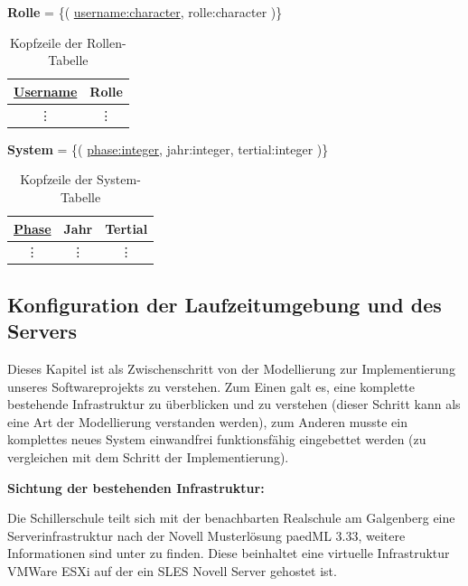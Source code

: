 \textbf{Rolle} = \{( \underline{username:character}, rolle:character )\}

\begin{table}[H]
\begin{center}
	\begin{tabular}{|c|c|}\hline
		\textbf{\underline{Username}} & \textbf{Rolle} \\ \hline
		\vdots & \vdots \\
	\end{tabular}
	\caption{Kopfzeile der Rollen-Tabelle}
\end{center}
\end{table}

\textbf{System} = \{( \underline{phase:integer}, jahr:integer, tertial:integer )\}

\begin{table}[H]
\begin{center}
	\begin{tabular}{|c|c|c|}\hline
		\textbf{\underline{Phase}} & \textbf{Jahr} & \textbf{Tertial} \\ \hline
		\vdots & \vdots & \vdots \\
	\end{tabular}
	\caption{Kopfzeile der System-Tabelle}
\end{center}
\end{table}

\subsection{Konfiguration der Laufzeitumgebung und des Servers}\label{subsec:Konfiguration der Laufzeitumgebung und des Server}

Dieses Kapitel ist als Zwischenschritt von der Modellierung zur Implementierung unseres Softwareprojekts zu verstehen.
Zum Einen galt es, eine komplette bestehende Infrastruktur zu überblicken und zu verstehen (dieser Schritt kann als eine Art der Modellierung verstanden werden),
zum Anderen musste ein komplettes neues System einwandfrei funktionsfähig eingebettet werden (zu vergleichen mit dem Schritt der Implementierung).

\textbf{Sichtung der bestehenden Infrastruktur:}

Die Schillerschule teilt sich mit der benachbarten Realschule am Galgenberg eine Serverinfrastruktur nach der Novell Musterlösung paedML 3.33, weitere Informationen sind unter \cite{paedML} zu finden. %
Diese beinhaltet eine virtuelle Infrastruktur \gls{VMWare} ESXi auf der ein \ac{SLES} Novell Server gehostet ist.

